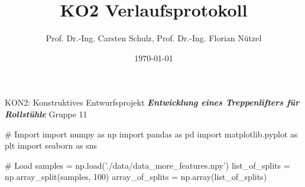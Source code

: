 \documentclass[10pt,a4paper]{article}
\author{{\LARGE Prof. Dr.-Ing. Carsten Schulz, Prof. Dr.-Ing. Florian Nützel}}
\title{\textbf{{\Huge KO2 Verlaufsprotokoll}}}
\date{{\Large \today}}
\begin{document}
\maketitle
\begin{center}
    \Large KON2: Konstruktives Entwurfsprojekt
    \vspace{1cm}
    \textbf{\textit{Entwicklung eines Treppenlifters für Rollstühle}}
    \vspace{1cm}
    {\Large Gruppe 11}
\end{center}
# Import
import numpy as np
import pandas as pd
import matplotlib.pyplot as plt
import seaborn as sns

# Load
samples = np.load('./data/data_more_features.npy')
list_of_splits = np.array_split(samples, 100)
array_of_splits = np.array(list_of_splits)
\end{document}
